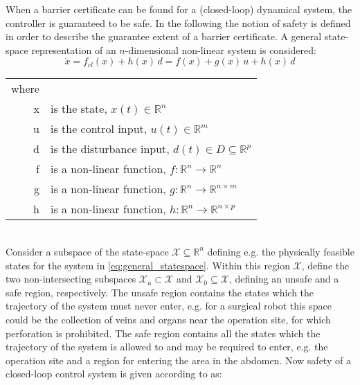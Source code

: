 When a barrier certificate can be found for a (closed-loop) dynamical system, the controller is guaranteed to be safe. In the following the notion of safety is defined in order to describe the guarantee extent of a barrier certificate. A general state-space representation of an $n$-dimensional non-linear system is considered:
\begin{equation}
\dot{x} = f_{cl}(x) + h(x)\,d = f(x) + g(x)\,u + h(x)\,d
\label{eq:general_statespace}
\end{equation}
\begin{tabular}{rl} 
where &  \\
\gls{x} &  is the state, $x(t) \in \mathbb{R}^n$\\
\gls{u} & is the control input, $u(t) \in \mathbb{R}^m$\\
\gls{d} & is the disturbance input, $d(t) \in D \subseteq \mathbb{R}^p$ \\
\gls{f} & is a non-linear function, $f:\mathbb{R}^n \rightarrow \mathbb{R}^n$\\
\gls{g} & is a non-linear function, $g:\mathbb{R}^n \rightarrow \mathbb{R}^{n \times m}$\\
\gls{h} & is a non-linear function, $h:\mathbb{R}^n \rightarrow \mathbb{R}^{n \times p}$
\end{tabular}\\

Consider a subspace of the state-space $\mathcal{X}\subseteq\mathbb{R}^n$ defining e.g. the physically feasible states for the system in \autoref{eq:general_statespace}. Within this region $\mathcal{X}$, define the two non-intersecting subspaces $\mathcal{X}_u\subset\mathcal{X}$ and $\mathcal{X}_0\subseteq\mathcal{X}$, defining an unsafe  and a safe region, respectively. The unsafe region contains the states which the trajectory of the system must never enter, e.g. for a surgical robot this space could be the collection of veins and organs near the operation site, for which perforation is prohibited. The safe region contains all the states which the trajectory of the system is allowed to and may be required to enter, e.g. the operation site and a region for entering the area in the abdomen.
Now safety of a closed-loop control system is given according to \citep{bib:safety,bib:prajna_framework} as:

